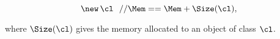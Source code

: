 $$
\new\, \cl \ \ // \Mem == \Mem + \Size(\cl),
$$ 

where $\Size(\cl)$ gives the memory allocated to an object of class $\cl$.





          





